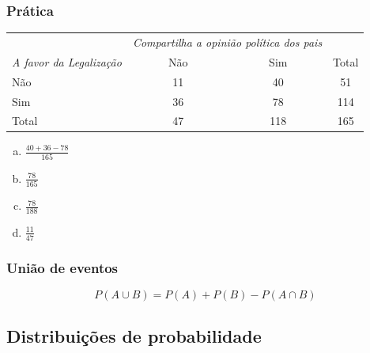 \begin{frame}
\frametitle{Prática}
\justifying
{}

{\small
\begin{center}
\begin{tabular}{l  cc c}
            & \multicolumn{2}{c}{\textit{Compartilha a opinião política dos pais}} & \\
\cline{2-3}
\textit{A favor da Legalização} & Não & Sim & Total \\
\hline
Não          & 11 & 40 & 51 \\
Sim         & 36 & 78 & 114 \\
\hline
Total       & 47 & 118 & 165
\end{tabular}
\end{center}
}

\begin{enumerate}[(a)]
\item $\frac{40 + 36 - 78}{165}$
\item $\frac{78}{165}$
\item $\frac{78}{188}$
\item $\frac{11}{47}$
\end{enumerate}

\end{frame}


\begin{frame}
\frametitle{União de eventos}
\justifying
{}
\[ P(A\cup B) = P(A) + P(B) - P(A\cap B) \]
\justifying
{}

\end{frame}


\subsection{Distribuições de probabilidade}



